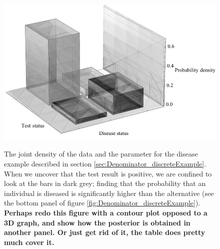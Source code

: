 \documentclass[11pt,fullpage]{book}
\begin{document}
\begin{figure}
\centering
\scalebox{0.8} 
{\includegraphics{Denominator_discreteJointDensity.pdf}}\caption{The joint density of the data and the parameter for the disease example described in section \ref{sec:Denominator_discreteExample}. When we uncover that the test result is positive, we are confined to look at the bars in dark grey; finding that the probability that an individual is diseased is significantly higher than the alternative (see the bottom panel of figure \ref{fig:Denominator_discreteExample}). \textbf{Perhaps redo this figure with a contour plot opposed to a 3D graph, and show how the posterior is obtained in another panel. Or just get rid of it, the table does pretty much cover it.}}\label{fig:Denominator_discreteJointDensity}
\end{figure}
\end{document}
